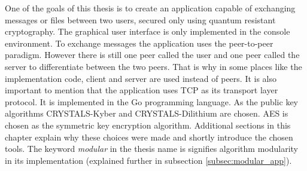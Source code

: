 One of the goals of this thesis is to create an application capable of exchanging messages or files between two users, secured only using quantum resistant cryptography. The graphical user interface is only implemented in the console environment. To exchange messages the application uses the peer-to-peer paradigm. However there is still one peer called the user and one peer called the server to differentiate between the two peers. That is why in some places like the implementation code, client and server are used instead of peers. It is also important to mention that the application uses TCP as its transport layer protocol. It is implemented in the Go programming language. As the public key algorithms CRYSTALS-Kyber and CRYSTALS-Dilithium are chosen. AES is chosen as the symmetric key encryption algorithm. Additional sections in this chapter explain why these choices were made and shortly introduce the chosen tools. The keyword \textit{modular} in the thesis name is signifies algorithm modularity in its implementation (explained further in subsection \ref{subsec:modular_app}). 
